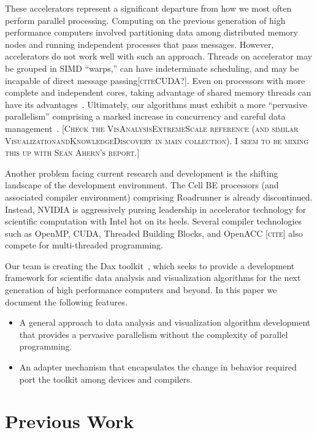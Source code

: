 \documentclass{sig-alternate}
\newcommand*{\lcite}[1]{~\cite{#1}}
\newcommand{\fix}[1]{{\color{red}\textsc{[#1]}}}
\begin{document}
These accelerators represent a significant departure from how we most often
perform parallel processing.  Computing on the previous generation of high
performance computers involved partitioning data among distributed memory
nodes and running independent processes that pass messages.  However,
accelerators do not work well with such an approach.  Threads on
accelerator may be grouped in SIMD ``warps,'' can have indeterminate
scheduling, and may be incapable of direct message passing\fix{citeCUDA?}.
Even on processors with more complete and independent cores, taking
advantage of shared memory threads can have its
advantages\lcite{Camp2010,Howison2011}.  Ultimately, our algorithms must
exhibit a more ``pervasive parallelism'' comprising a marked increase in
concurrency and careful data
management\lcite{VisAnalysisExtremeScale,ExascaleRoadMap}. \fix{Check the
  VisAnalysisExtremeScale reference (and similar
  VisualizationandKnowledgeDiscovery in main collection).  I seem to be
  mixing this up with Sean Ahern's report.}

Another problem facing current research and development is the shifting
landscape of the development environment.  The Cell BE processors (and
associated compiler environment) comprising Roadrunner is already
discontinued.  Instead, NVIDIA is aggressively pursing leadership in
accelerator technology for scientific computation with Intel hot on its
heels.  Several compiler technologies such as OpenMP, CUDA, Threaded
Building Blocks, and OpenACC \fix{cite} also compete for multi-threaded
programming.

Our team is creating the Dax toolkit\lcite{Moreland2011:LDAV}, which seeks
to provide a development framework for scientific data analysis and
visualization algorithms for the next generation of high performance
computers and beyond.  In this paper we document the following features.
\begin{itemize}
\item A general approach to data analysis and visualization algorithm
  development that provides a pervasive parallelism without the complexity
  of parallel programming.
\item An adapter mechanism that encapsulates the change in behavior
  required port the toolkit among devices and compilers.
\end{itemize}

\section{Previous Work}
\end{document}
